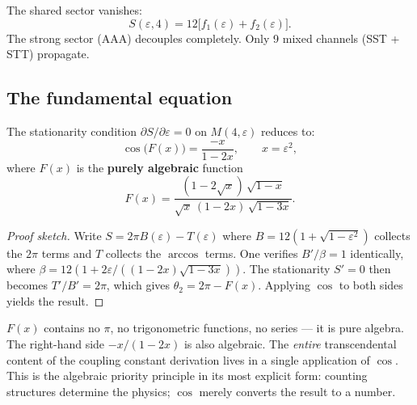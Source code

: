 \begin{remark}
\begin{corollary}[Flat manifold $N=4$]
\label{cor:flat_action}
The shared sector vanishes:
\begin{equation}
S(\varepsilon, 4) = 12\bigl[f_1(\varepsilon) + f_2(\varepsilon)\bigr].
\end{equation}
The strong sector (AAA) decouples completely.  Only 9 mixed channels (SST + STT) propagate.
\end{corollary}

\subsection{The fundamental equation}
\label{sec:fundamental_eq}

\begin{theorem}
\label{thm:fundamental_eq}
The stationarity condition $\partial S/\partial\varepsilon = 0$ on $M(4,\varepsilon)$ reduces to:
\begin{equation}
\boxed{\cos\bigl(F(x)\bigr) = \frac{-x}{1-2x}, \qquad x = \varepsilon^2,}
\end{equation}
where $F(x)$ is the \textbf{purely algebraic} function
\begin{equation}
F(x) = \frac{(1-2\sqrt{x})\,\sqrt{1-x}}{\sqrt{x}\,(1-2x)\,\sqrt{1-3x}}.
\end{equation}
\end{theorem}
\begin{proof}[Proof sketch]
Write $S = 2\pi B(\varepsilon) - T(\varepsilon)$ where $B = 12(1 + \sqrt{1\!-\!\varepsilon^2})$ collects the $2\pi$ terms and $T$ collects the $\arccos$ terms.  One verifies $B'/\beta = 1$ identically, where $\beta = 12(1 + 2\varepsilon/((1\!-\!2x)\sqrt{1\!-\!3x}))$.  The stationarity $S' = 0$ then becomes $T'/B' = 2\pi$, which gives $\theta_2 = 2\pi - F(x)$.  Applying $\cos$ to both sides yields the result.
\end{proof}

\begin{remark}
$F(x)$ contains no $\pi$, no trigonometric functions, no series --- it is pure algebra.  The right-hand side $-x/(1\!-\!2x)$ is also algebraic.  The \emph{entire} transcendental content of the coupling constant derivation lives in a single application of $\cos$.  This is the algebraic priority principle in its most explicit form: counting structures determine the physics; $\cos$ merely converts the result to a number.
\end{remark}


\end{remark}
